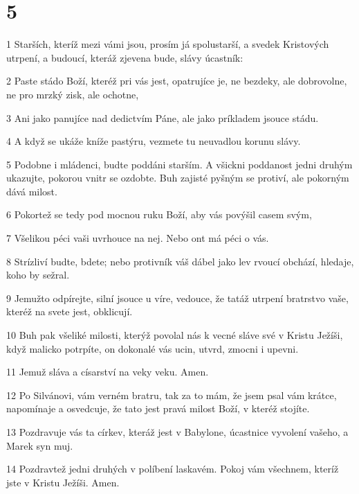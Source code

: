 \chapter{5}

\par 1 Starších, kteríž mezi vámi jsou, prosím já spolustarší, a svedek Kristových utrpení, a budoucí, kteráž zjevena bude, slávy úcastník:
\par 2 Paste stádo Boží, kteréž pri vás jest, opatrujíce je, ne bezdeky, ale dobrovolne, ne pro mrzký zisk, ale ochotne,
\par 3 Ani jako panujíce nad dedictvím Páne, ale jako príkladem jsouce stádu.
\par 4 A když se ukáže kníže pastýru, vezmete tu neuvadlou korunu slávy.
\par 5 Podobne i mládenci, budte poddáni starším. A všickni poddanost jedni druhým ukazujte, pokorou vnitr se ozdobte. Buh zajisté pyšným se protiví, ale pokorným dává milost.
\par 6 Pokortež se tedy pod mocnou ruku Boží, aby vás povýšil casem svým,
\par 7 Všelikou péci vaši uvrhouce na nej. Nebo ont má péci o vás.
\par 8 Strízliví budte, bdete; nebo protivník váš dábel jako lev rvoucí obchází, hledaje, koho by sežral.
\par 9 Jemužto odpírejte, silní jsouce u víre, vedouce, že tatáž utrpení bratrstvo vaše, kteréž na svete jest, obklicují.
\par 10 Buh pak všeliké milosti, kterýž povolal nás k vecné sláve své v Kristu Ježíši, když malicko potrpíte, on dokonalé vás ucin, utvrd, zmocni i upevni.
\par 11 Jemuž sláva a císarství na veky veku. Amen.
\par 12 Po Silvánovi, vám verném bratru, tak za to mám, že jsem psal vám krátce, napomínaje a osvedcuje, že tato jest pravá milost Boží, v kteréž stojíte.
\par 13 Pozdravuje vás ta církev, kteráž jest v Babylone, úcastnice vyvolení vašeho, a Marek syn muj.
\par 14 Pozdravtež jedni druhých v políbení laskavém. Pokoj vám všechnem, kteríž jste v Kristu Ježíši. Amen.


